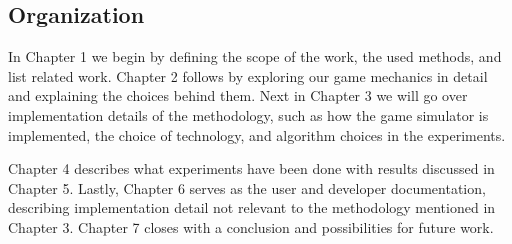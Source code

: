 \subsection*{Organization}

In Chapter 1 we begin by defining the scope of the work, the used methods, and list related work. Chapter 2 follows by exploring our game mechanics in detail and explaining the choices behind them. Next in Chapter 3 we will go over implementation details of the methodology, such as how the game simulator is implemented, the choice of technology, and algorithm choices in the experiments.

Chapter 4 describes what experiments have been done with results discussed in Chapter 5. Lastly, Chapter 6 serves as the user and developer documentation, describing implementation detail not relevant to the methodology mentioned in Chapter 3. Chapter 7 closes with a conclusion and possibilities for future work.